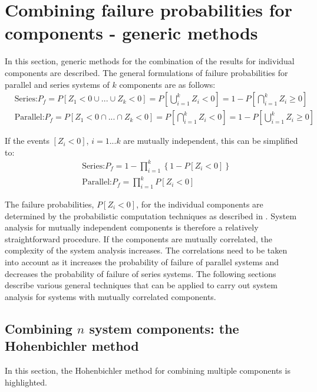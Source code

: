 \section{Combining failure probabilities for components - generic methods\label{sec:combinationprocedure}}
In this section, generic methods for the combination of the results for individual components are described. The general formulations of failure probabilities for parallel and series systems of $k$ components are as follows:
\begin{align}
&\text{Series:}  P_{f} =P\left[Z_{1} <0\cup ...\cup Z_{k} <0\right]=P\left[\bigcup _{i=1}^{k}Z_{i} <0 \right]=1-P\left[\bigcap _{i=1}^{k}Z_{i} \ge 0 \right] \label{eq:2-63} \\
&\text{Parallel:} P_{f} =P\left[Z_{1} <0\cap ...\cap Z_{k} <0\right]=P\left[\bigcap _{i=1}^{k}Z_{i} <0 \right]=1-P\left[\bigcup _{i=1}^{k}Z_{i} \ge 0 \right] \label{eq2-64} 
\end{align}

If the events $[Z_i<0]$, $i=1...k$ are mutually independent, this can be simplified to:
\begin{align}
&\text{Series:}  P_{f} =1-\prod _{i=1}^{k}\left\{1-P\left[Z_{i} <0\right]\right\}  \label{eq:2-65} \\
&\text{Parallel:} P_{f} =\prod _{i=1}^{k}P\left[Z_{i} <0\right]  \label{eq:2-66} 
\end{align}

The failure probabilities, $P[Z_i<0]$, for the individual components are determined by the probabilistic computation techniques as described in . System analysis for mutually independent components is therefore a relatively straightforward procedure. If the components are mutually correlated, the complexity of the system analysis increases. The correlations need to be taken into account as it increases the probability of failure of parallel systems and decreases the probability of failure of series systems. The following sections describe various general techniques that can be applied to carry out system analysis for systems with mutually correlated components.

\subsection{Combining $n$ system components: the Hohenbichler method}\label{Section_2.4.2}
In this section, the Hohenbichler method for combining multiple components is highlighted.

